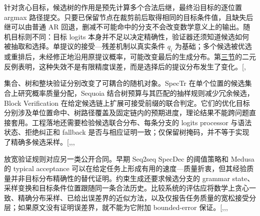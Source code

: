 \documentclass[
  a4paper,
  UTF8,
  fontset=none,
  zihao=5]{ctexart}
\begin{document}
针对贪心目标，候选树的作用是预先计算多个合法后继，最终沿目标的逐位置
argmax
路径提交。只要已保留节点在裁剪前后取得相同的目标条件值，且缺失后继可以由普通
AR
回退，删减不可能命中的分支不会改变数学意义上的输出。随机目标则不同：目标
logits
本身并不足以决定精确性，验证器还须知道候选如何被抽取和选择。单提议的接受---残差机制以真实条件
\(q_i\)
为基础；多个候选被优选或重排后，未经修正地沿用原提议概率，可能改变最后的生成分布。第\hyperref[fidelity]{三节}的二元反例表明，这种失效不是有限精度误差，而是选择后的提议分布发生了变化。{[},\citeproc{ref-chen}{3}{]}

集合、树和整块验证分别改变了可耦合的随机对象。SpecTr
在单个位置的候选集合上研究概率质量分配，Sequoia
结合树预算与其匹配的抽样规则减少冗余候选，Block Verification
在给定候选链上扩展可接受前缀的联合判定。它们的优化目标分别涉及单位置命中、树路径覆盖及固定链内的预期进度，理论结果不能跨问题直接套用。工程落地还需要检验候选联合分布、每条分支的
logits processor 与语法状态、拒绝纠正和 fallback
是否与相应证明一致；仅保留树掩码，并不等于实现了精确多候选采样。{[},,,\citeproc{ref-sglangdocs}{55}{]}

放宽验证规则对应另一类公开合同。早期 Seq2seq SpecDec 的阈值策略和 Medusa
的 typical acceptance
可以在给定任务上形成有用的速度---质量折衷，但其经验质量并非目标分布精确性的替代证明。约束生成还要求候选分支的
grammar
state、采样变换和目标条件位置跟随同一条合法历史。比较系统的评估应将数学上贪心一致、精确分布采样、已给出误差界的近似方法，以及仅报告任务质量的宽松接受分层；如果原文没有证明误差界，就不能为它附加
bounded-error
保证。{[},,,\citeproc{ref-vllm-sampler}{57}{]}
\end{document}

